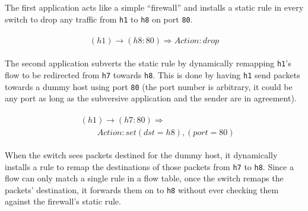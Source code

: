 The first application acts like a simple ``firewall'' and installs a static rule in every switch to drop any traffic from \texttt{h1} to \texttt{h8} on port \texttt{80}.

\begin{align}
\begin{aligned}
(h1) \rightarrow (h8:80) \Rightarrow Action: drop \nonumber
\end{aligned}
\end{align}

The second application subverts the static rule by dynamically remapping \texttt{h1}'s flow to be redirected from \texttt{h7} towards \texttt{h8}.
This is done by having \texttt{h1} send packets towards a dummy host using port \texttt{80} (the port number is arbitrary, it could be any port as long as the subversive application and the sender are in agreement).

\begin{align}
\begin{aligned}
&(h1) \rightarrow (h7:80) \Rightarrow  \\
    &\qquad Action: set (dst = h8), (port = 80) \nonumber
\end{aligned}
\end{align}

When the switch sees packets destined for the dummy host, it dynamically installs a rule to remap the destinations of those packets from \texttt{h7} to \texttt{h8}.
Since a flow can only match a single rule in a flow table, once the switch remaps the packets' destination, it forwards them on to \texttt{h8} without ever checking them against the firewall's static rule.


